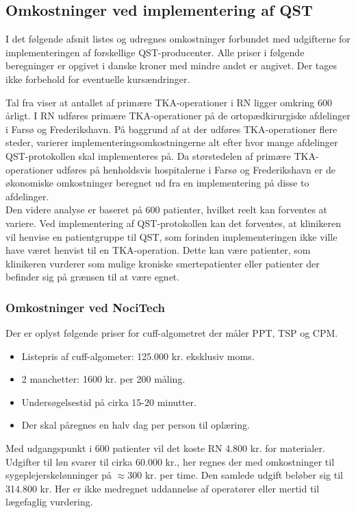 \subsection{Omkostninger ved implementering af QST}
I det følgende afsnit listes og udregnes omkostninger forbundet med udgifterne for implementeringen af forskellige QST-producenter. Alle priser i følgende beregninger er opgivet i danske kroner med mindre andet er angivet. Der tages ikke forbehold for eventuelle kursændringer. 

Tal fra  viser at antallet af primære TKA-operationer i RN ligger omkring 600 årligt. \citep{aarsrapport2016} I RN udføres primære TKA-operationer på de ortopædkirurgiske afdelinger i Farsø og Frederikshavn. På baggrund af at der udføres TKA-operationer flere steder, varierer implementeringsomkostningerne alt efter hvor mange afdelinger QST-protokollen skal implementeres på. Da størstedelen af primære TKA-operationer udføres på henholdsvis hospitalerne i Farsø og Frederikshavn er de økonomiske omkostninger beregnet ud fra en implementering på disse to afdelinger. \\
Den videre analyse er baseret på 600 patienter, hvilket reelt kan forventes at variere. Ved implementering af QST-protokollen kan det forventes, at klinikeren vil henvise en patientgruppe til QST, som forinden implementeringen ikke ville have været henvist til en TKA-operation. Dette kan være patienter, som klinikeren vurderer som mulige kroniske smertepatienter eller patienter der befinder sig på grænsen til at være egnet. 

\subsubsection{Omkostninger ved NociTech}
Der er oplyst følgende priser for cuff-algometret der måler PPT, TSP og CPM.
\begin{itemize} 
\item Listepris af cuff-algometer: 125.000 kr. eksklusiv moms.
\item 2 manchetter: 1600 kr. per 200 måling.
\item Undersøgelsestid på cirka 15-20 minutter.
\item Der skal påregnes en halv dag per person til oplæring.
\end{itemize}

Med udgangspunkt i 600 patienter vil det koste RN 4.800 kr. for materialer. Udgifter til løn svarer til cirka 60.000 kr., her regnes der med omkostninger til sygeplejerskelønninger på $\approx 300$ kr. per time. \citep{DST1} \citep{DTS2} Den samlede udgift beløber sig til 314.800 kr. Her er ikke medregnet uddannelse af operatører eller mertid til lægefaglig vurdering.

